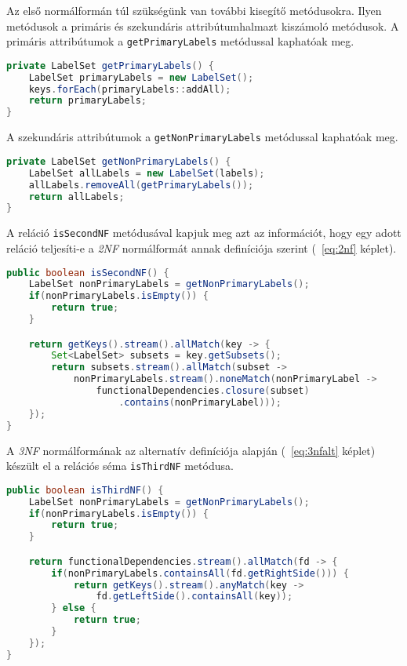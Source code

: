 Az első normálformán túl szükségünk van további kisegítő metódusokra. Ilyen metódusok a primáris és szekundáris attribútumhalmazt kiszámoló metódusok. A primáris attribútumok a \lstinline{getPrimaryLabels} metódussal kaphatóak meg.

\linespread{1}
\begin{lstlisting}[language=Java]
private LabelSet getPrimaryLabels() {
	LabelSet primaryLabels = new LabelSet();
	keys.forEach(primaryLabels::addAll);
	return primaryLabels;
}
\end{lstlisting}

A szekundáris attribútumok a \lstinline{getNonPrimaryLabels} metódussal kaphatóak meg.

\linespread{1}
\begin{lstlisting}[language=Java]
private LabelSet getNonPrimaryLabels() {
	LabelSet allLabels = new LabelSet(labels);
	allLabels.removeAll(getPrimaryLabels());
	return allLabels;
}
\end{lstlisting}

A reláció \lstinline{isSecondNF} metódusával kapjuk meg azt az információt, hogy egy adott reláció teljesíti-e a \textit{2NF} normálformát annak definíciója szerint (~\ref{eq:2nf} képlet).

\linespread{1}
\begin{lstlisting}[language=Java]
public boolean isSecondNF() {
    LabelSet nonPrimaryLabels = getNonPrimaryLabels();
    if(nonPrimaryLabels.isEmpty()) {
        return true;
    }

    return getKeys().stream().allMatch(key -> {
        Set<LabelSet> subsets = key.getSubsets();
        return subsets.stream().allMatch(subset -> 
            nonPrimaryLabels.stream().noneMatch(nonPrimaryLabel ->
                functionalDependencies.closure(subset)
                    .contains(nonPrimaryLabel)));
    });
}
\end{lstlisting}

A \textit{3NF} normálformának az alternatív definíciója alapján (~\ref{eq:3nfalt} képlet) készült el a relációs séma \lstinline{isThirdNF} metódusa.

\linespread{1}
\begin{lstlisting}[language=Java]
public boolean isThirdNF() {
	LabelSet nonPrimaryLabels = getNonPrimaryLabels();
	if(nonPrimaryLabels.isEmpty()) {
		return true;
	}

	return functionalDependencies.stream().allMatch(fd -> {
		if(nonPrimaryLabels.containsAll(fd.getRightSide())) {
			return getKeys().stream().anyMatch(key -> 
				fd.getLeftSide().containsAll(key));
		} else {
			return true;
		}
	});
}
\end{lstlisting}

